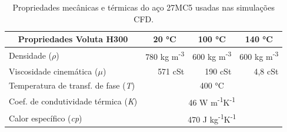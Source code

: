 \begin{table}[htb]
    \centering
    \caption[Propriedades do fluido de têmpera Voluta H300]%
    {Propriedades mecânicas e térmicas do aço 27MC5 usadas nas simulações CFD.}
    \label{tab:Propriedades_VolutaH300}
    \begin{tabular}{lrrr} 
    \toprule
    \multicolumn{1}{c}{\textbf{Propriedades Voluta H300}} & \multicolumn{1}{c}{\textbf{20 °C}} & \multicolumn{1}{c}{\textbf{100 °C}} & \multicolumn{1}{c}{\textbf{140 °C}}  \\ 
    \hline\hline
    Densidade ($\rho$)                                    & 780 kg m\textsuperscript{-3}       & 600 kg m\textsuperscript{-3}        & 600 kg m\textsuperscript{-3}         \\
    Viscosidade cinemática ($\mu$)                        & 571 cSt                            & 190 cSt                             & 4,8 cSt                              \\
    Temperatura de transf. de fase (\textit{T})           & \multicolumn{3}{c}{400 °C}                                                                                      \\
    Coef. de condutividade térmica (\textit{K})           & \multicolumn{3}{c}{46 W m\textsuperscript{-1}K\textsuperscript{-1}}                                             \\
    Calor específico (\textit{cp})                        & \multicolumn{3}{c}{470 J kg\textsuperscript{-1}K\textsuperscript{-1}}                                           \\
    \bottomrule
    \end{tabular}
    \end{table}
